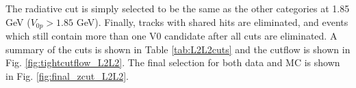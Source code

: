 The radiative cut is simply selected to be the same as the other categories at 1.85 GeV ($V_{0p}>1.85$ GeV). Finally, tracks with shared hits are eliminated, and events which still contain more than one V0 candidate after all cuts are eliminated. A summary of the cuts is shown in Table \ref{tab:L2L2cuts} and the cutflow is shown in Fig. \ref{fig:tightcutflow_L2L2}. The final selection for both data and MC is shown in Fig. \ref{fig:final_zcut_L2L2}.%


